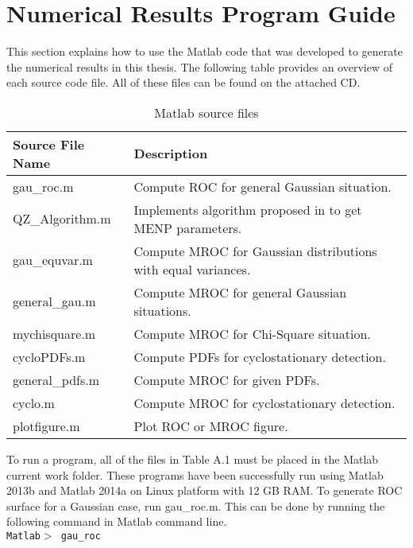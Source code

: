 \resetdatestamp

\chapter{Numerical Results Program Guide}
\label{A:LaTeXmacros}

This section explains how to use the Matlab code that was developed to generate the numerical results in this thesis.  The following table provides an overview of each source code file. All of these files can be found on the attached CD. 

\begin{table}[h]
\begin{tabular}{l|p{350pt}}
\hline
\hline
Source File Name                  & Description                                                                \\ \hline
gau\_roc.m      & Compute ROC for general Gaussian situation.              \\
QZ\_Algorithm.m & Implements algorithm proposed in \cite{zhang2000efficient} to get MENP parameters.                \\
gau\_equvar.m   & Compute MROC for Gaussian distributions with equal variances. \\
general\_gau.m         & Compute MROC for general Gaussian situations.                   \\
mychisquare.m            & Compute MROC for Chi-Square situation.                        \\
cycloPDFs.m              & Compute PDFs for cyclostationary detection.                 \\ 
general\_pdfs.m           & Compute MROC for given PDFs.                                 \\
cyclo.m				     & Compute MROC for cyclostationary detection.             \\		
plotfigure.m             & Plot ROC or MROC figure. \\
\hline
\end{tabular}
\label{filelist}
\caption{Matlab source files}
\end{table}

To run a program, all of the files in Table A.1 must be placed in the Matlab current work folder. These programs have been successfully run using Matlab 2013b and Matlab 2014a on Linux platform with 12 GB RAM.  
To generate ROC surface for a Gaussian case, run gau\_roc.m. This can be done by running the following command in Matlab command line.
\\\texttt{Matlab$>$ gau\_roc}

